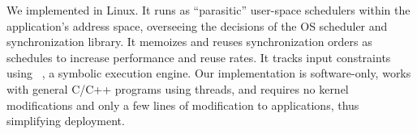 We implemented \tern in Linux.  It runs as ``parasitic''
user-space schedulers within the application's address space, overseeing
the decisions of the OS scheduler and synchronization library.  It
memoizes and reuses synchronization orders as schedules to increase
performance and reuse rates. It tracks input constraints using
\klee~\cite{klee:osdi08}, a symbolic execution engine.  Our implementation
is software-only, works with general C/C++ programs using threads, and
requires no kernel modifications and only a few lines of modification to
applications, thus simplifying deployment.






